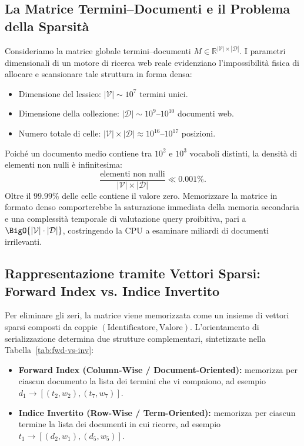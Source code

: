 \subsection{La Matrice Termini--Documenti e il Problema della Sparsit\`a}
Consideriamo la matrice globale termini--documenti $M \in \mathbb{R}^{|\mathcal{V}| \times |\mathcal{D}|}$. I parametri dimensionali di un motore di ricerca web reale evidenziano l'impossibilit\`a fisica di allocare e scansionare tale struttura in forma densa:
\begin{itemize}
    \item Dimensione del lessico: $|\mathcal{V}| \sim 10^7$ termini unici.
    \item Dimensione della collezione: $|\mathcal{D}| \sim 10^9 \text{--} 10^{10}$ documenti web.
    \item Numero totale di celle: $|\mathcal{V}| \times |\mathcal{D}| \approx 10^{16} \text{--} 10^{17}$ posizioni.
\end{itemize}
Poich\'e un documento medio contiene tra $10^2$ e $10^3$ vocaboli distinti, la densit\`a di elementi non nulli \`e infinitesima:
\begin{equation}
\frac{\text{elementi non nulli}}{|\mathcal{V}| \times |\mathcal{D}|} \ll 0.001\%.
\end{equation}
Oltre il $99.99\%$ delle celle contiene il valore zero. Memorizzare la matrice in formato denso comporterebbe la saturazione immediata della memoria secondaria e una complessit\`a temporale di valutazione query proibitiva, pari a $\BigO{|\mathcal{V}| \cdot |\mathcal{D}|}$, costringendo la CPU a esaminare miliardi di documenti irrilevanti.

\subsection{Rappresentazione tramite Vettori Sparsi: Forward Index vs. Indice Invertito}
Per eliminare gli zeri, la matrice viene memorizzata come un insieme di vettori sparsi composti da coppie $(\text{Identificatore}, \text{Valore})$. L'orientamento di serializzazione determina due strutture complementari, sintetizzate nella Tabella~\ref{tab:fwd-vs-inv}:
\begin{itemize}
    \item \textbf{Forward Index (Column-Wise / Document-Oriented):} memorizza per ciascun documento la lista dei termini che vi compaiono, ad esempio $d_1 \to [(t_2, w_2), (t_7, w_7)]$.
    \item \textbf{Indice Invertito (Row-Wise / Term-Oriented):} memorizza per ciascun termine la lista dei documenti in cui ricorre, ad esempio $t_1 \to [(d_2, w_1), (d_5, w_5)]$.
\end{itemize}

